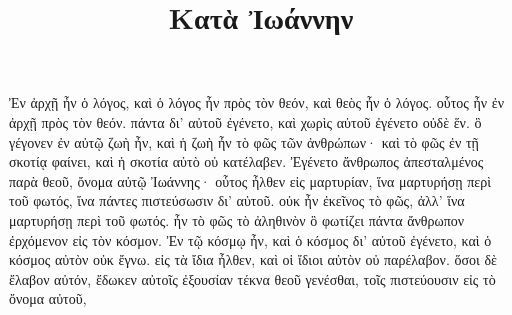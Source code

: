 \documentclass{openreader}
\title{Κατὰ Ἰωάννην}
\date{}
\begin{document}
\maketitle
\raggedbottom 
\fontsize{16pt}{24pt}\selectfont


Ἐν ἀρχῇ ἦν ὁ λόγος, καὶ ὁ λόγος ἦν πρὸς τὸν θεόν, καὶ θεὸς ἦν ὁ λόγος. 
οὗτος ἦν ἐν ἀρχῇ πρὸς τὸν θεόν. 
πάντα δι’ αὐτοῦ ἐγένετο, καὶ χωρὶς αὐτοῦ ἐγένετο οὐδὲ ἕν. ὃ γέγονεν 
ἐν αὐτῷ ζωὴ ἦν, καὶ ἡ ζωὴ ἦν τὸ φῶς τῶν ἀνθρώπων· 
καὶ τὸ φῶς ἐν τῇ σκοτίᾳ φαίνει, καὶ ἡ σκοτία αὐτὸ οὐ κατέλαβεν. 
Ἐγένετο ἄνθρωπος ἀπεσταλμένος παρὰ θεοῦ, ὄνομα αὐτῷ Ἰωάννης· 
οὗτος ἦλθεν εἰς μαρτυρίαν, ἵνα μαρτυρήσῃ περὶ τοῦ φωτός, ἵνα πάντες πιστεύσωσιν δι’ αὐτοῦ. 
οὐκ ἦν ἐκεῖνος τὸ φῶς, ἀλλ’ ἵνα μαρτυρήσῃ περὶ τοῦ φωτός. 
ἦν τὸ φῶς τὸ ἀληθινὸν ὃ φωτίζει πάντα ἄνθρωπον ἐρχόμενον εἰς τὸν κόσμον. 
Ἐν τῷ κόσμῳ ἦν, καὶ ὁ κόσμος δι’ αὐτοῦ ἐγένετο, καὶ ὁ κόσμος αὐτὸν οὐκ ἔγνω. 
εἰς τὰ ἴδια ἦλθεν, καὶ οἱ ἴδιοι αὐτὸν οὐ παρέλαβον. 
ὅσοι δὲ ἔλαβον αὐτόν, ἔδωκεν αὐτοῖς ἐξουσίαν τέκνα θεοῦ γενέσθαι, τοῖς πιστεύουσιν εἰς τὸ ὄνομα αὐτοῦ, 
\end{document}

